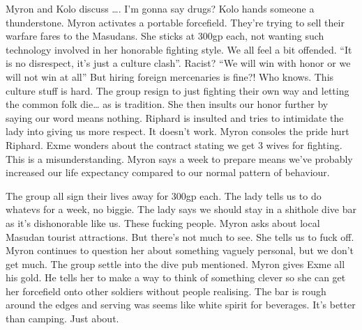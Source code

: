 Myron and Kolo discuss …. I’m gonna say drugs? Kolo hands someone a thunderstone. Myron activates a portable forcefield. They’re trying to sell their warfare fares to the Masudans. She sticks at 300gp each, not wanting such technology involved in her honorable fighting style. We all feel a bit offended. “It is no disrespect, it’s just a culture clash”. Racist? “We will win with honor or we will not win at all” But hiring foreign mercenaries is fine?! Who knows. This culture stuff is hard. The group resign to just fighting their own way and letting the common folk die… as is tradition. She then insults our honor further by saying our word means nothing. Riphard is insulted and tries to intimidate the lady into giving us more respect. It doesn’t work. Myron consoles the pride hurt Riphard. Exme wonders about the contract stating we get 3 wives for fighting. This is a misunderstanding. Myron says a week to prepare means we’ve probably increased our life expectancy compared to our normal pattern of behaviour.\medskip

The group all sign their lives away for 300gp each. The lady tells us to do whatevs for a week, no biggie. The lady says we should stay in a shithole dive bar as it’s dishonorable like us. These fucking people. Myron asks about local Masudan tourist attractions. But there’s not much to see. She tells us to fuck off. Myron continues to question her about something vaguely personal, but we don’t get much. The group settle into the dive pub mentioned. Myron gives Exme all his gold. He tells her to make a way to think of something clever so she can get her forcefield onto other soldiers without people realising. The bar is rough around the edges and serving was seems like white spirit for beverages. It’s better than camping. Just about.\medskip



%

\clearpage